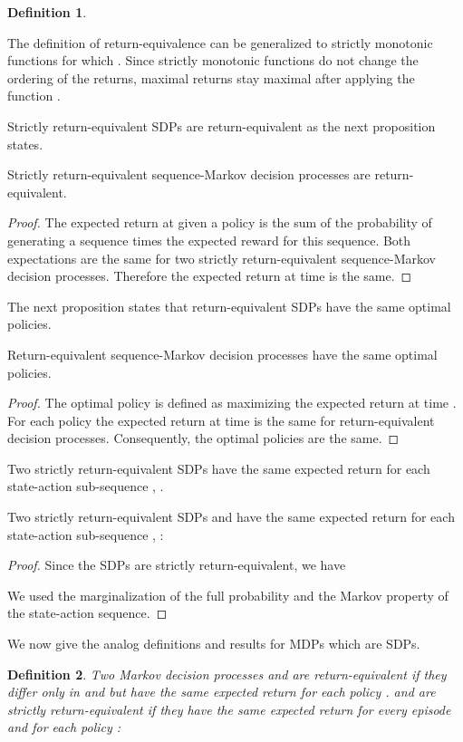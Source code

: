 \documentclass{article}
\newtheorem{definitionA}{Definition}
\begin{document}
\begin{appendices}
\begin{definitionA}
\end{definitionA}
The definition of return-equivalence can be generalized to 
strictly monotonic functions 
for which . Since strictly monotonic functions
do not change the ordering of the returns, maximal returns stay
maximal after applying the function .

Strictly return-equivalent SDPs are return-equivalent as the
next proposition states.
\begin{propositionA}
\label{th:AstrictToEqsdp}
  Strictly return-equivalent sequence-Markov decision processes
  are return-equivalent.
\end{propositionA}
\begin{proof}
 The expected return at  given a policy
  is the sum of
  the probability of generating a sequence times the expected reward
  for this sequence. Both expectations are the same for 
  two strictly return-equivalent sequence-Markov decision processes.
 Therefore the expected return at time  is the same.
\end{proof}

The next proposition states that return-equivalent SDPs  
have the same optimal policies.
\begin{propositionA}
\label{th:AsdpPol}
  Return-equivalent sequence-Markov decision processes 
  have the same optimal policies.
\end{propositionA}
\begin{proof}
  The optimal policy is defined as maximizing the expected return at
  time . 
  For each policy the 
  expected return at
  time  is the same for return-equivalent decision processes.
  Consequently, the optimal policies are the same.
\end{proof}

Two strictly return-equivalent SDPs have the same 
expected return for each state-action sub-sequence
, .
\begin{lemmaA}
\label{th:AreturnSub}
Two strictly return-equivalent SDPs  and 
have the same expected return for each
state-action sub-sequence
, :

\end{lemmaA}
\begin{proof}
Since the SDPs are strictly return-equivalent, we have

We used the marginalization of the full probability and
the Markov property of the state-action sequence.
\end{proof}

We now give the analog definitions and
results for MDPs which are SDPs.
\begin{definitionA}
  \label{def:AreturnEq}
  Two Markov decision processes  and 
  are {\em return-equivalent} if
  they differ only in  and  but
  have the same expected return
   for each policy .
   and  
  are {\em strictly return-equivalent} if
  they have the same expected return for every episode and
  for each policy :
  

\end{definitionA}
\end{appendices}
\end{document}

